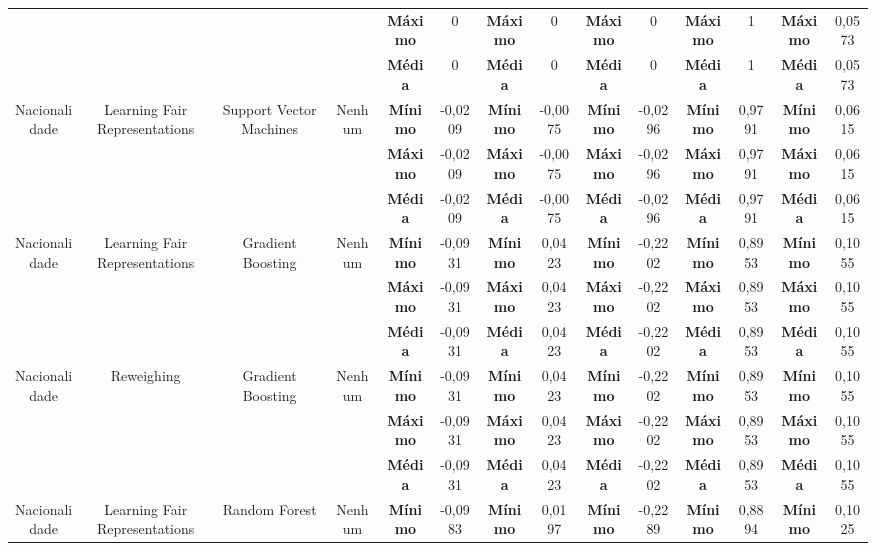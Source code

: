 \documentclass[Portugues,Final]{ic-tese-v3}
\begin{document}
\begin{table}[H]
\begin{center}
{\begin{tabular}{c|c|c|c|c|c|c|c|c|c|c|c|c|c}
             & & & & \textbf{Máximo} & 0 & \textbf{Máximo} & 0 & \textbf{Máximo} & 0 & \textbf{Máximo} & 1 & \textbf{Máximo} & 0,0573 \\
             & & & & \textbf{Média} & 0 & \textbf{Média} & 0 & \textbf{Média} & 0 & \textbf{Média} & 1 & \textbf{Média} & 0,0573 \\
            \hline
            \multirow{3}{*}{Nacionalidade} & \multirow{3}{*}{Learning Fair Representations} & \multirow{3}{*}{Support Vector Machines} & \multirow{3}{*}{Nenhum} & \textbf{Mínimo} & -0,0209 & \textbf{Mínimo} & -0,0075 & \textbf{Mínimo} & -0,0296 & \textbf{Mínimo} & 0,9791 & \textbf{Mínimo} & 0,0615 \\
             & & & & \textbf{Máximo} & -0,0209 & \textbf{Máximo} & -0,0075 & \textbf{Máximo} & -0,0296 & \textbf{Máximo} & 0,9791 & \textbf{Máximo} & 0,0615 \\
             & & & & \textbf{Média} & -0,0209 & \textbf{Média} & -0,0075 & \textbf{Média} & -0,0296 & \textbf{Média} & 0,9791 & \textbf{Média} & 0,0615 \\
            \hline
            \multirow{3}{*}{Nacionalidade} & \multirow{3}{*}{Learning Fair Representations} & \multirow{3}{*}{Gradient Boosting} & \multirow{3}{*}{Nenhum} & \textbf{Mínimo} & -0,0931 & \textbf{Mínimo} & 0,0423 & \textbf{Mínimo} & -0,2202 & \textbf{Mínimo} & 0,8953 & \textbf{Mínimo} & 0,1055 \\
             & & & & \textbf{Máximo} & -0,0931 & \textbf{Máximo} & 0,0423 & \textbf{Máximo} & -0,2202 & \textbf{Máximo} & 0,8953 & \textbf{Máximo} & 0,1055 \\
             & & & & \textbf{Média} & -0,0931 & \textbf{Média} & 0,0423 & \textbf{Média} & -0,2202 & \textbf{Média} & 0,8953 & \textbf{Média} & 0,1055 \\
            \hline
            \multirow{3}{*}{Nacionalidade} & \multirow{3}{*}{Reweighing} & \multirow{3}{*}{Gradient Boosting} & \multirow{3}{*}{Nenhum} & \textbf{Mínimo} & -0,0931 & \textbf{Mínimo} & 0,0423 & \textbf{Mínimo} & -0,2202 & \textbf{Mínimo} & 0,8953 & \textbf{Mínimo} & 0,1055 \\
             & & & & \textbf{Máximo} & -0,0931 & \textbf{Máximo} & 0,0423 & \textbf{Máximo} & -0,2202 & \textbf{Máximo} & 0,8953 & \textbf{Máximo} & 0,1055 \\
             & & & & \textbf{Média} & -0,0931 & \textbf{Média} & 0,0423 & \textbf{Média} & -0,2202 & \textbf{Média} & 0,8953 & \textbf{Média} & 0,1055 \\
            \hline
            \multirow{3}{*}{Nacionalidade} & \multirow{3}{*}{Learning Fair Representations} & \multirow{3}{*}{Random Forest} & \multirow{3}{*}{Nenhum} & \textbf{Mínimo} & -0,0983 & \textbf{Mínimo} & 0,0197 & \textbf{Mínimo} & -0,2289 & \textbf{Mínimo} & 0,8894 & \textbf{Mínimo} & 0,1025 \\

\end{tabular}}
\end{center}
\end{table}
\end{document}
